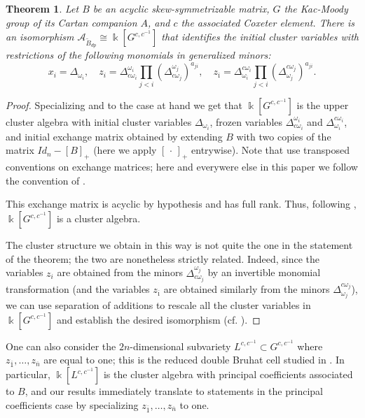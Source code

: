 \documentclass[12pt]{amsart}
\newcommand{\cA}{\mathcal{A}}
\newcommand{\kk}{\Bbbk}
\newcommand{\ol}[1]{\overline{#1}}
\newcommand{\Bdp}{\widetilde{B}_{dp}}
\newcommand{\cvar}{z}
\newtheorem{theorem}{Theorem}[section]
\theoremstyle{remark}
\numberwithin{equation}{section}
\numberwithin{figure}{section}
\begin{document}
\begin{theorem}
  \label{thm:coordring}
  Let $B$ be an acyclic skew-symmetrizable matrix, $G$ the Kac-Moody group of its Cartan companion $A$, and $c$ the associated Coxeter element.
  There is an isomorphism $\cA_{\Bdp} \cong \kk[G^{c,c^{-1}}]$ that identifies the initial cluster variables with restrictions of the following monomials in generalized minors:
  \begin{equation}
    \label{eq:initialcluster}
    x_i = \Delta_{\omega_i},
    \quad
    \cvar_i = \Delta^{\omega_i}_{ c\omega_i} \prod_{j < i}(\Delta^{\omega_j}_{c \omega_j})^{a_{ji}},
    \quad
    \cvar_{\ol{\imath}} = \Delta^{c \omega_i}_{\omega_i} \prod_{j < i}(\Delta^{c \omega_j}_{\omega_j})^{a_{ji}}.
  \end{equation}
\end{theorem}
\begin{proof}
  Specializing \cite[Theorem 2.10]{BFZ05} and \cite[Theorem 4.9]{Wil13} to the case at hand we get that $\kk[G^{c,c^{-1}}]$ is the upper cluster algebra with initial cluster variables $\Delta_{\omega_i}$, frozen variables $\Delta_{c\omega_i}^{\omega_i}$ and $\Delta_{\omega_i}^{c\omega_i}$, and initial exchange matrix obtained by extending $B$ with two copies of the matrix $Id_n-[B]_+$ (here we apply $[\,\cdot\,]_+$ entrywise).
  Note that \cite{BFZ05,Wil13} use transposed conventions on exchange matrices; here and everywere else in this paper we follow the convention of \cite{BFZ05}.

  This exchange matrix is acyclic by hypothesis and has full rank.
  Thus, following \cite[Corollary 1.19]{BFZ05}, $\kk[G^{c,c^{-1}}]$ is a cluster algebra.

  The cluster structure we obtain in this way is not quite the one in the statement of the theorem; the two are nonetheless strictly related.
  Indeed, since the variables $\cvar_i$ are obtained from the minors $\Delta^{\omega_j}_{ c\omega_j}$ by an invertible monomial transformation (and the variables $\cvar_{\ol{\imath}}$ are obtained similarly from the minors $\Delta^{c \omega_j}_{\omega_j}$), we can use separation of additions to rescale all the cluster variables in $\kk[G^{c,c^{-1}}]$ and establish the desired isomorphism (cf. \cite[Proposition 4.5]{YZ08}).
\end{proof}

  One can also consider the $2n$-dimensional subvariety $L^{c,c^{-1}} \subset G^{c,c^{-1}}$ where $z_{\ol{1}},\dotsc,z_{\ol{n}}$ are equal to one; this is the reduced double Bruhat cell studied in \cite{YZ08}.
  In particular, $\kk[L^{c,c^{-1}}]$ is the cluster algebra with principal coefficients associated to $B$, and our results immediately translate to statements in the principal coefficients case by specializing $\cvar_{\ol{1}},\dotsc,\cvar_{\ol{n}}$ to one.
\end{document}
